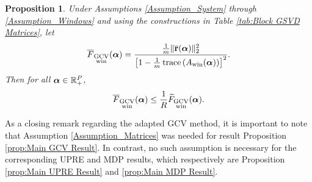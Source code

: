\documentclass[12pt]{article}
\newtheorem{proposition}{Proposition}[section]
\begin{document}
\begin{proposition}
\label{prop:GCV Bound}
Under Assumptions \ref{Assumption_System} through \ref{Assumption_Windows} and using the constructions in Table \ref{tab:Block GSVD Matrices}, let
\begin{equation}
\overline{F}_{\substack{\text{GCV} \\ \text{win}}}(\bm{\alpha}) = \frac{\frac{1}{m}\|\overline{\mathbf{r}}(\bm{\alpha})\|_2^2}{\left[1 - \frac{1}{m}\operatorname{trace}\left(A_{\text{win}}(\bm{\alpha})\right)\right]^2}.
\end{equation}
Then for all $\bm{\alpha} \in \mathbb{R}_{+}^{P}$,
\begin{equation}
\label{eq:GCV Bound}
\overline{F}_{\substack{\text{GCV} \\ \text{win}}}(\bm{\alpha}) \leq \frac{1}{R}\widetilde{F}_{\substack{\text{GCV} \\ \text{win}}}(\bm{\alpha}).
\end{equation}
\end{proposition}
\noindent As a closing remark regarding the adapted GCV method, it is important to note that Assumption \ref{Assumption_Matrices} was needed for result Proposition \ref{prop:Main GCV Result}. In contrast, no such assumption is necessary for the corresponding UPRE and MDP results, which respectively are Proposition \eqref{prop:Main UPRE Result} and \eqref{prop:Main MDP Result}.
\end{document}
